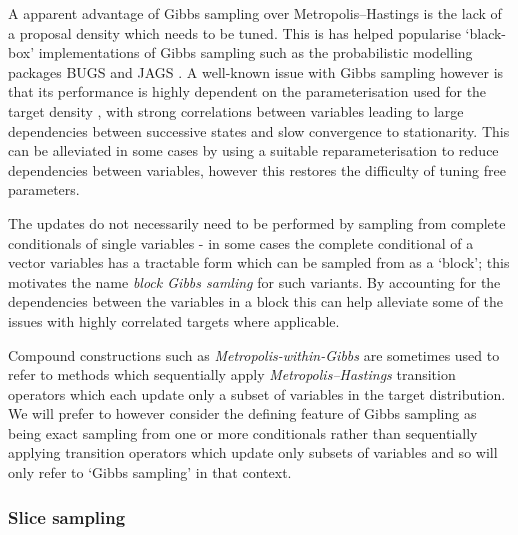 A apparent advantage of Gibbs sampling over Metropolis--Hastings is the lack of a proposal density which needs to be tuned. This is has helped popularise `black-box' implementations of Gibbs sampling such as the probabilistic modelling packages BUGS \citep{gilks1994language} and JAGS \citep{plummer2003jags}. A well-known issue with Gibbs sampling however is that its performance is highly dependent on the parameterisation used for the target density \citep{raftery1991many}, with strong correlations between variables leading to large dependencies between successive states and slow convergence to stationarity. This can be alleviated in some cases by using a suitable reparameterisation to reduce dependencies between variables, however this restores the difficulty of tuning free parameters.

The updates do not necessarily need to be performed by sampling from complete conditionals of single variables - in some cases the complete conditional of a vector variables has a tractable form which can be sampled from as a `block'; this motivates the name \emph{block Gibbs samling} for such variants. By accounting for the dependencies between the variables in a block this can help alleviate some of the issues with highly correlated targets where applicable.

Compound constructions such as \emph{Metropolis-within-Gibbs} are sometimes used to refer to methods which sequentially apply \emph{Metropolis--Hastings} transition operators which each update only a subset of variables in the target distribution. We will prefer to however consider the defining feature of Gibbs sampling as being exact sampling from one or more conditionals rather than sequentially applying transition operators which update only subsets of variables and so will only refer to `Gibbs sampling' in that context.

\subsubsection{Slice sampling}

